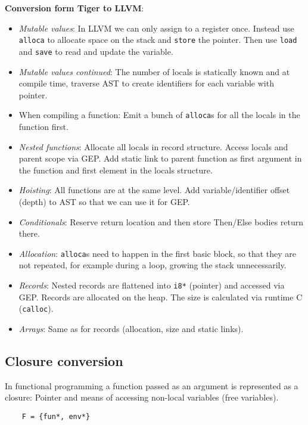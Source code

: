 \textbf{Conversion form Tiger to LLVM}:
\begin{itemize}
    \item\textit{Mutable values}: In LLVM we can only assign to a register once. Instead use \texttt{alloca} to allocate space on the stack and \texttt{store} the pointer. Then use \texttt{load} and \texttt{save} to read and update the variable.
    \item \textit{Mutable values continued}: The number of locals is statically known and at compile time, traverse AST to create identifiers for each variable with pointer.
    \item When compiling a function: Emit a bunch of \texttt{alloca}s for all the locals in the function first.
    \item \textit{Nested functions}: Allocate all locals in record structure. Access locals and parent scope via GEP. Add static link to parent function as first argument in the function and first element in the locals structure.
    \item \textit{Hoisting}: All functions are at the same level. Add variable/identifier offset (depth) to AST so that we can use it for GEP.
    \item \textit{Conditionals}: Reserve return location and then store Then/Else bodies return there.
    \item \textit{Allocation}: \texttt{alloca}s need to happen in the first basic block, so that they are not repeated, for example during a loop, growing the stack unnecessarily.
    \item \textit{Records}: Nested records are flattened into \texttt{i8*} (pointer) and accessed via GEP. Records are allocated on the heap. The size is calculated via runtime C (\texttt{calloc}).
    \item \textit{Arrays}: Same as for records (allocation, size and static links).
\end{itemize}

\subsection{Closure conversion}

In functional programming a function passed as an argument is represented as a closure: Pointer and means of accessing non-local variables (free variables).

\begin{lstlisting}
    F = {fun*, env*}
\end{lstlisting}    

